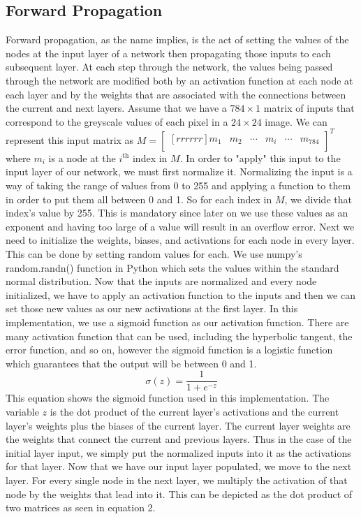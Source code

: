 \documentclass[12pt]{article}
\theoremstyle{definition}
\theoremstyle{plain}
\begin{document}
\subsection{Forward Propagation}
Forward propagation, as the name implies, is the act of setting the values of the nodes at the input layer of a network then propagating those inputs to each subsequent layer. At each step through the network, the values being passed through the network are modified both by an activation function at each node at each layer and by the weights that are associated with the connections between the current and next layers. Assume that we have a $784\times 1$ matrix of inputs that correspond to the greyscale values of each pixel in a $24\times 24$ image. We can represent this input matrix as $M = \begin{bmatrix}[rrrrrr]m_1&m_2&\cdots&m_i&\cdots&m_{784}\\\end{bmatrix}^T$ where $m_i$ is a node at the $i^{\mathrm{th}}$ index in $M$. In order to "apply" this input to the input layer of our network, we must first normalize it. Normalizing the input is a way of taking the range of values from 0 to 255 and applying a function to them in order to put them all between 0 and 1. So for each index in $M$, we divide that index's value by 255. This is mandatory since later on we use these values as an exponent and having too large of a value will result in an overflow error. Next we need to initialize the weights, biases, and activations for each node in every layer. This can be done by setting random values for each. We use numpy's random.randn() function in Python which sets the values within the standard normal distribution. Now that the inputs are normalized and every node initialized, we have to apply an activation function to the inputs and then we can set those new values as our new activations at the first layer. In this implementation, we use a sigmoid function as our activation function. There are many activation function that can be used, including the hyperbolic tangent, the error function, and so on, however the sigmoid function is a logistic function which guarantees that the output will be between 0 and 1.
\begin{equation}\label{eqn:Sigmoid}
\sigma(z) = \dfrac{1}{1+e^{-z}}
\end{equation}
This equation shows the sigmoid function used in this implementation. The variable $z$ is the dot product of the current layer's activations and the current layer's weights plus the biases of the current layer. The current layer weights are the weights that connect the current and previous layers. Thus in the case of the initial layer input, we simply put the normalized inputs into it as the activations for that layer. Now that we have our input layer populated, we move to the next layer. For every single node in the next layer, we multiply the activation of that node by the weights that lead into it. This can be depicted as the dot product of two matrices as seen in equation 2.
\end{document}
